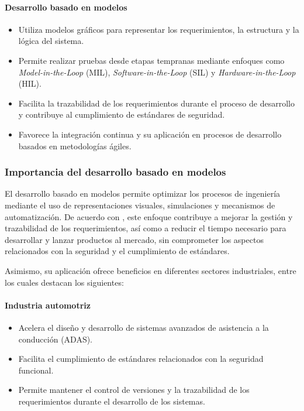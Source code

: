 \documentclass[12pt,a4paper]{article}
\begin{document}
\paragraph{Desarrollo basado en modelos}

\begin{itemize}
    \item Utiliza modelos gráficos para representar los requerimientos, la estructura y la lógica del sistema.
    \item Permite realizar pruebas desde etapas tempranas mediante enfoques como \textit{Model-in-the-Loop} (MIL), \textit{Software-in-the-Loop} (SIL) y \textit{Hardware-in-the-Loop} (HIL).
    \item Facilita la trazabilidad de los requerimientos durante el proceso de desarrollo y contribuye al cumplimiento de estándares de seguridad.
    \item Favorece la integración continua y su aplicación en procesos de desarrollo basados en metodologías ágiles.
\end{itemize}

\subsubsection{Importancia del desarrollo basado en modelos}

El desarrollo basado en modelos permite optimizar los procesos de ingeniería mediante el uso de representaciones visuales, simulaciones y mecanismos de automatización. De acuerdo con \textcite{valera2026}, este enfoque contribuye a mejorar la gestión y trazabilidad de los requerimientos, así como a reducir el tiempo necesario para desarrollar y lanzar productos al mercado, sin comprometer los aspectos relacionados con la seguridad y el cumplimiento de estándares.

Asimismo, su aplicación ofrece beneficios en diferentes sectores industriales, entre los cuales destacan los siguientes:

\paragraph{Industria automotriz}

\begin{itemize}
    \item Acelera el diseño y desarrollo de sistemas avanzados de asistencia a la conducción (ADAS).
    \item Facilita el cumplimiento de estándares relacionados con la seguridad funcional.
    \item Permite mantener el control de versiones y la trazabilidad de los requerimientos durante el desarrollo de los sistemas.
\end{itemize}
\end{document}
